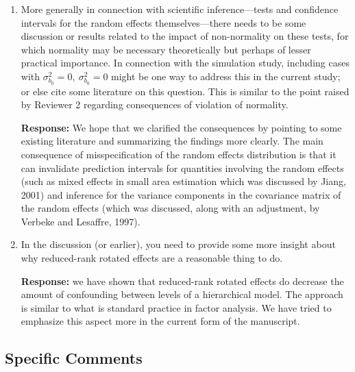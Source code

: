 \documentclass[11pt]{article}
\begin{document}
\begin{enumerate}
\item More generally in connection with scientific inference---tests and confidence intervals for the random effects themselves---there needs to be some discussion or results related to the impact of non-normality on these tests, for which normality may be necessary theoretically but perhaps of lesser practical importance. In connection with the simulation study, including cases with $\sigma^2_{b_0} = 0, \ \sigma^2_{b_0} = 0$ might be one way to address this in the current study; or else cite some literature on this question. This is similar to the point raised by Reviewer 2 regarding consequences of violation of normality.

\textbf{Response:} We hope that we clarified the consequences by pointing to some existing literature and summarizing the findings more clearly. The main consequence of misspecification of the random effects distribution is that it can invalidate prediction intervals for quantities involving the random effects (such as mixed effects in small area estimation which was discussed by Jiang, 2001) and inference for the variance components in the covariance matrix of the random effects (which was discussed, along with an adjustment, by Verbeke and Lesaffre, 1997).


\item In the discussion (or earlier), you need to provide some more insight about why reduced-rank rotated effects are a reasonable thing to do.

\textbf{Response:} we have shown that reduced-rank rotated effects do decrease the amount of confounding between levels of a hierarchical model. The approach is similar to what is standard practice in factor analysis. We have tried to emphasize this aspect more in the current form of the manuscript.

\end{enumerate}


\subsection*{Specific Comments}
\end{document}
